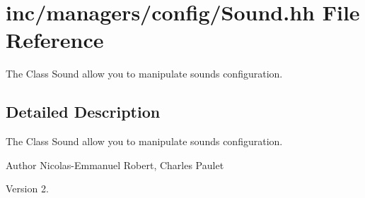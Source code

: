 \hypertarget{Sound_8hh}{}\section{inc/managers/config/\+Sound.hh File Reference}
\label{Sound_8hh}


The Class Sound allow you to manipulate sound\textquotesingle{}s configuration.  




\subsection{Detailed Description}
The Class Sound allow you to manipulate sound\textquotesingle{}s configuration. 

\begin{DoxyAuthor}{Author}
Nicolas-\/\+Emmanuel Robert, Charles Paulet 
\end{DoxyAuthor}
\begin{DoxyVersion}{Version}
2. 
\end{DoxyVersion}
